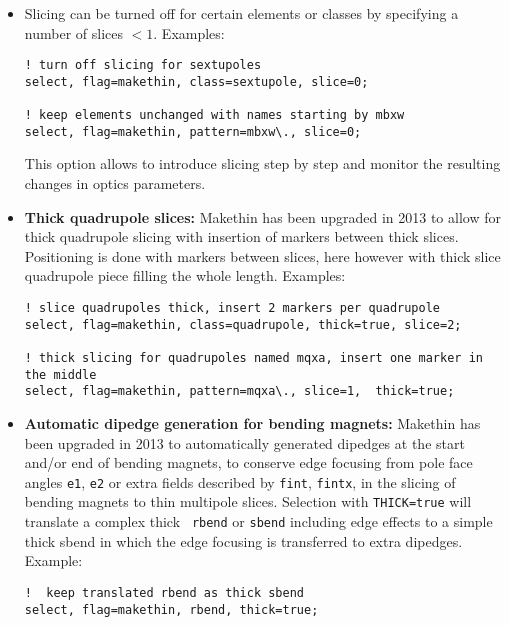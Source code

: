 \begin{itemize}
\item Slicing can be turned off for certain elements or classes by specifying
a number of slices $< 1$. Examples:
\begin{verbatim}
! turn off slicing for sextupoles
select, flag=makethin, class=sextupole, slice=0; 

! keep elements unchanged with names starting by mbxw
select, flag=makethin, pattern=mbxw\., slice=0; 
\end{verbatim}
This option allows to introduce slicing step by step and monitor the
resulting changes in optics parameters.

\item {\bf Thick quadrupole slices:}
Makethin has been upgraded in 2013 to allow for thick quadrupole slicing
with insertion of markers between thick slices. 
Positioning is done with markers between slices, here however with thick
slice quadrupole piece filling the whole length. 
Examples:
\begin{verbatim}
! slice quadrupoles thick, insert 2 markers per quadrupole
select, flag=makethin, class=quadrupole, thick=true, slice=2; 

! thick slicing for quadrupoles named mqxa, insert one marker in the middle
select, flag=makethin, pattern=mqxa\., slice=1,  thick=true; 
\end{verbatim}

\item {\bf Automatic dipedge generation for bending magnets:}
Makethin has been upgraded in 2013 to automatically generated dipedges
at the start and/or end of bending magnets, to conserve edge focusing
from pole face angles {\tt e1}, {\tt e2} or extra fields described by
{\tt fint}, {\tt fintx}, in the slicing of bending magnets to thin
multipole slices. 
Selection with {\tt THICK=true} will translate a complex thick {\tt
  rbend} or {\tt sbend} including edge effects to a simple thick
sbend in which the edge focusing is transferred to extra
dipedges. 
Example:
\begin{verbatim}
!  keep translated rbend as thick sbend
select, flag=makethin, rbend, thick=true;
\end{verbatim}
\end{itemize}


